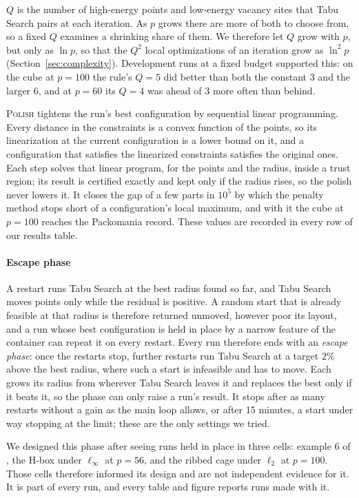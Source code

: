 \documentclass[preprint,12pt]{elsarticle}
\theoremstyle{remark}
\begin{document}
$Q$ is the number of high-energy points and low-energy vacancy sites that Tabu
Search pairs at each iteration. As $p$ grows there are more of both to choose
from, so a fixed $Q$ examines a shrinking share of them. We therefore let $Q$
grow with $p$, but only as $\ln p$, so that the $Q^2$ local optimizations of an
iteration grow as $\ln^2 p$ (Section~\ref{sec:complexity}). Development runs at
a fixed budget supported this: on the cube at $p = 100$ the rule's $Q = 5$ did
better than both the constant $3$ and the larger $6$, and at $p = 60$ its $Q =
4$ was ahead of $3$ more often than behind.

\textsc{Polish} tightens the run's best configuration by sequential linear
programming. Every distance in the constraints is a convex function of the
points, so its linearization at the current configuration is a lower bound on
it, and a configuration that satisfies the linearized constraints satisfies the
original ones. Each step solves that linear program, for the points and the
radius, inside a trust region; its result is certified exactly and kept only if
the radius rises, so the polish never lowers it. It closes the gap of a few
parts in $10^5$ by which the penalty method stops short of a configuration's
local maximum, and with it the cube at $p = 100$ reaches the Packomania record.
These values are recorded in every row of our results table.

\paragraph{Escape phase} A restart runs Tabu Search at the best radius found so
far, and Tabu Search moves points only while the residual is positive. A random
start that is already feasible at that radius is therefore returned unmoved,
however poor its layout, and a run whose best configuration is held in place by
a narrow feature of the container can repeat it on every restart. Every run
therefore ends with an \emph{escape phase}: once the restarts stop, further
restarts run Tabu Search at a target $2\%$ above the best radius, where such a
start is infeasible and has to move. Each grows its radius from wherever Tabu
Search leaves it and replaces the best only if it beats it, so the phase can
only raise a run's result. It stops after as many restarts without a gain as the
main loop allows, or after 15 minutes, a start under way stopping at the limit;
these are the only settings we tried.

We designed this phase after seeing runs held in place in three cells: example 6
of \citet{stoyan2013}, the H-box under $\ell_\infty$ at $p = 56$, and the ribbed
cage under $\ell_2$ at $p = 100$. Those cells therefore informed its design and
are not independent evidence for it. It is part of every run, and every table
and figure reports runs made with it.
\end{document}
